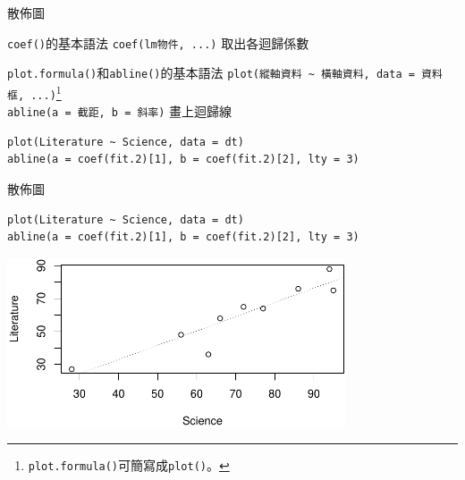 \documentclass[12pt, aspectratio=43]{beamer}
\let\oldfootnote\footnote
\renewcommand\footnote[1]{\hspace{-0.3em}\oldfootnote{\ignorespaces#1}\hspace{0.3em}}
\begin{document}
\begin{frame}[fragile]{散佈圖}

\begin{block}{\texttt{coef()}的基本語法}
\verb+coef(lm物件, ...)+ 取出各迴歸係數
\end{block}

\begin{block}{\texttt{plot.formula()}和\texttt{abline()}的基本語法}
\verb+plot(縱軸資料 ~ 橫軸資料, data = 資料框, ...)+\oldfootnote{\texttt{plot.formula()}可簡寫成\texttt{plot()}。}\\
\verb+abline(a = 截距, b = 斜率)+ 畫上迴歸線
\end{block}

\begin{verbatim}
plot(Literature ~ Science, data = dt)
abline(a = coef(fit.2)[1], b = coef(fit.2)[2], lty = 3)
\end{verbatim}
\end{frame}

\begin{frame}[fragile]{散佈圖}

\begin{verbatim}
plot(Literature ~ Science, data = dt)
abline(a = coef(fit.2)[1], b = coef(fit.2)[2], lty = 3)
\end{verbatim}

\begin{center}
\includegraphics[width=0.75\textwidth]{Rplot-sct.pdf}
\end{center}
\end{frame}

%




\end{document}
